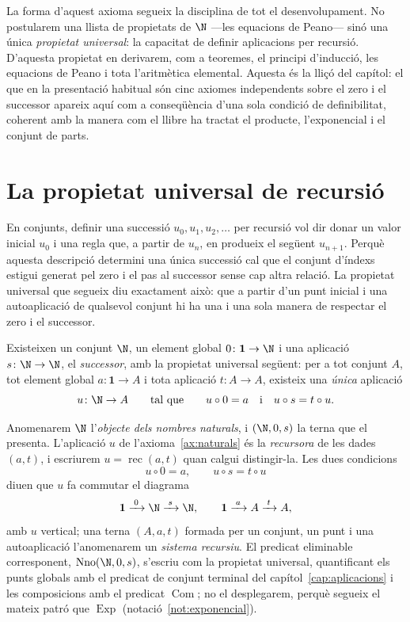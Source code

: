 La forma d'aquest axioma segueix la disciplina de tot el
desenvolupament. No postularem una llista de propietats de \(\N\) ---les
equacions de Peano--- sinó una única \emph{propietat universal}: la
capacitat de definir aplicacions per recursió. D'aquesta propietat en
derivarem, com a teoremes, el principi d'inducció, les equacions de Peano
i tota l'aritmètica elemental. Aquesta és la lliçó del capítol: el que en
la presentació habitual són cinc axiomes independents sobre el zero i el
successor apareix aquí com a conseqüència d'una sola condició de
definibilitat, coherent amb la manera com el llibre ha tractat el
producte, l'exponencial i el conjunt de parts.

\section{La propietat universal de recursió}\label{sec:nno-universal}

En conjunts, definir una successió \(u_0,u_1,u_2,\dots\) per recursió vol
dir donar un valor inicial \(u_0\) i una regla que, a partir de \(u_n\),
en produeix el següent \(u_{n+1}\). Perquè aquesta descripció determini
una única successió cal que el conjunt d'índexs estigui generat pel zero i
el pas al successor sense cap altra relació. La propietat universal que
segueix diu exactament això: que a partir d'un punt inicial i una
autoaplicació de qualsevol conjunt hi ha una i una sola manera de
respectar el zero i el successor.

\begin{axioma}\label{ax:naturals}
Existeixen un conjunt \(\N\), un element global \(0\colon\mathbf1\to\N\) i
una aplicació \(s\colon\N\to\N\), el \emph{successor}, amb la propietat
universal següent: per a tot conjunt \(A\), tot element global
\(a\colon\mathbf1\to A\) i tota aplicació \(t\colon A\to A\), existeix una
\emph{única} aplicació
\[
u\colon\N\to A
\qquad\text{tal que}\qquad
u\circ 0=a
\quad\text{i}\quad
u\circ s=t\circ u .
\]
\end{axioma}

\begin{notacio}\label{not:nno}
Anomenarem \(\N\) l'\emph{objecte dels nombres naturals}, i
\((\N,0,s)\) la terna que el presenta. L'aplicació \(u\) de
l'axioma~\ref{ax:naturals} és la \emph{recursora} de les dades
\((a,t)\), i escriurem \(u=\operatorname{rec}(a,t)\) quan calgui
distingir-la. Les dues condicions
\[
u\circ 0=a,
\qquad
u\circ s=t\circ u
\]
diuen que \(u\) fa commutar el diagrama
\[
\mathbf1\xrightarrow{\;0\;}\N\xrightarrow{\;s\;}\N,
\qquad
\mathbf1\xrightarrow{\;a\;}A\xrightarrow{\;t\;}A,
\]
amb \(u\) vertical; una terna \((A,a,t)\) formada per un conjunt, un punt
i una autoaplicació l'anomenarem un \emph{sistema recursiu}. El predicat
eliminable corresponent, \(\operatorname{Nno}(\N,0,s)\), s'escriu com la
propietat universal, quantificant els punts globals amb el predicat de
conjunt terminal del capítol~\ref{cap:aplicacions} i les composicions amb
el predicat \(\operatorname{Com}\); no el desplegarem, perquè segueix el
mateix patró que \(\operatorname{Exp}\)
(notació~\ref{not:exponencial}).
\end{notacio}

